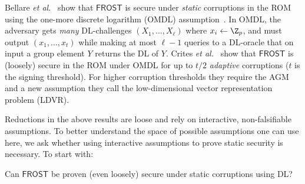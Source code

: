 
  Bellare \emph{et al.}~\cite{EPRINT:BelTesZhu22} show that $\mathsf{FROST}$ is secure under \emph{static} corruptions in the ROM using the one-more discrete logarithm (OMDL) assumption~\cite{xxx}. In OMDL, the adversary gets \emph{many} DL-challenges $(X_1,\ldots,X_\ell)$ where $x_i \gets \Z_p$, and must output $(x_1,\ldots,x_t)$ while making at most $\ell-1$ queries to a DL-oracle that on input a group element $Y$ returns the DL of $Y$.
 Crites \emph{et al.}~\cite{} show that $\mathsf{FROST}$ is (loosely) secure in the ROM under OMDL for up to $t/2$ \emph{adaptive} corruptions ($t$ is the signing threshold). For  higher corruption thresholds they require the AGM and a new assumption they call the  low-dimensional vector representation problem (LDVR). %



 Reductions in the above results are loose and rely on  interactive, non-falsifiable assumptions.  To better understand the space of possible assumptions one can use here, we ask whether using  interactive assumptions to prove static security is necessary. To start with:
\begin{ques}
Can $\mathsf{FROST}$ be proven (even loosely) secure under static corruptions using DL? 
\end{ques} 


